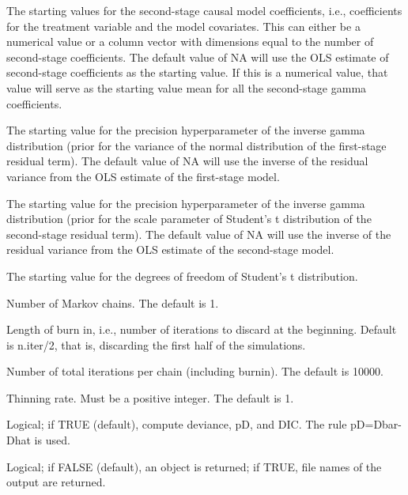 \documentclass[a4paper]{book}
\begin{document}
\begin{Arguments}
\begin{ldescription}
\item[\code{gamma.start}] The starting values for the second-stage causal model coefficients,
i.e., coefficients for the treatment variable and the model covariates.
This can either be a numerical value or a column vector with dimensions
equal to the number of second-stage coefficients.
The default value of NA will use the OLS estimate of second-stage coefficients as the starting value.
If this is a numerical value, that value will
serve as the starting value mean for all the second-stage gamma coefficients.

\item[\code{u.start}] The starting value for the precision hyperparameter of the inverse gamma distribution
(prior for the variance of the normal distribution of the first-stage residual term).
The default value of NA will use the inverse of the residual variance from the OLS estimate of the first-stage model.

\item[\code{e.start}] The starting value for the precision hyperparameter of the inverse gamma distribution
(prior for the scale parameter of Student's t distribution of the second-stage residual term).
The default value of NA will use the inverse of the residual variance from the OLS estimate
of the second-stage model.

\item[\code{df.start}] The starting value for the degrees of freedom of Student's t distribution.

\item[\code{n.chains}] Number of Markov chains. The default is 1.

\item[\code{n.burnin}] Length of burn in, i.e., number of iterations to discard at the beginning.
Default is n.iter/2, that is, discarding the first half of the simulations.

\item[\code{n.iter}] Number of total iterations per chain (including burnin). The default is 10000.

\item[\code{n.thin}] Thinning rate. Must be a positive integer. The default is 1.

\item[\code{DIC}] Logical; if TRUE (default), compute deviance, pD, and DIC. The rule pD=Dbar-Dhat is used.

\item[\code{codaPkg}] Logical; if FALSE (default), an object is returned; if TRUE,
file names of the output are returned.
\end{ldescription}
\end{Arguments}
\end{document}
